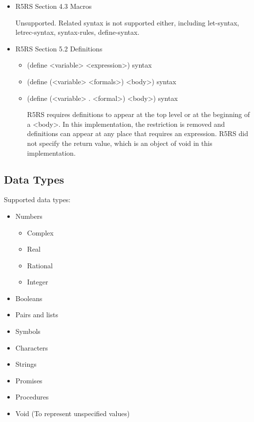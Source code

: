\documentclass{article}
\begin{document}
\begin{itemize}
\item R5RS Section 4.3 Macros
	
	Unsupported. Related syntax is not supported either, including let-syntax, letrec-syntax, syntax-rules, define-syntax.
	
\item R5RS Section 5.2 Definitions
	\begin{itemize}
		\item (define <variable> <expression>)	\hfill	syntax
		\item (define (<variable> <formals>) <body>)	\hfill syntax
		\item (define (<variable> . <formal>) <body>)	\hfill syntax
		
		R5RS requires definitions to appear at the top level or at the beginning of a <body>. In this implementation, the restriction is removed and definitions can appear at any place that requires an expression. R5RS did not specify the return value, which is an object of void in this implementation.
	\end{itemize}

\end{itemize}

\subsection{Data Types}
\noindent
Supported data types:

\begin{itemize}
	\item Numbers
		\begin{itemize}
			\item Complex
			\item Real
			\item Rational
			\item Integer
		\end{itemize}
	
	\item Booleans
	
	\item Pairs and lists
	
	\item Symbols
	
	\item Characters
	
	\item Strings
	
	\item Promises
	
	\item Procedures
	
	\item Void	(To represent unspecified values)
\end{itemize}
\end{document}
